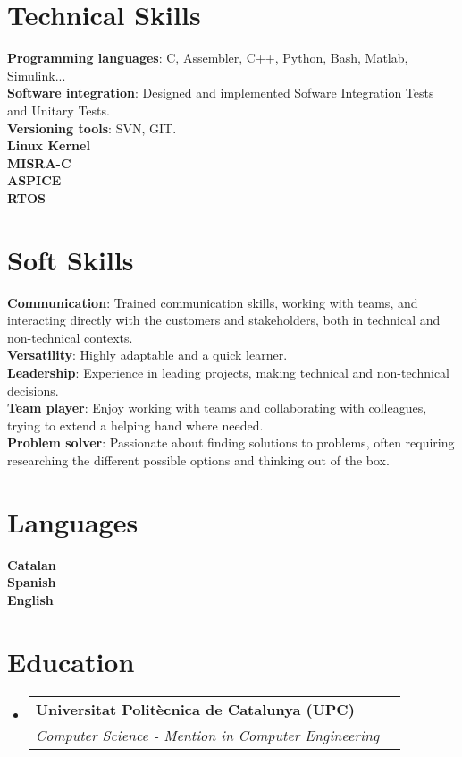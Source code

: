 \documentclass[letterpaper,11pt]{article}
\makeatletter
\newcommand{\resumeSubheading}[4]{
  \vspace{-2pt}\item
    \begin{tabular*}{0.97\textwidth}[t]{l@{\extracolsep{\fill}}r}
      \textbf{#1} & #2 \\
      \textit{\small#3} & \textit{\small #4} \\
    \end{tabular*}\vspace{-7pt}
}
\newcommand{\resumeSubHeadingListStart}{\begin{itemize}[leftmargin=0.15in, label={}]}
\newcommand{\resumeSubHeadingListEnd}{\end{itemize}}
\makeatother
\begin{document}
%
\section{Technical Skills}
 \begin{itemize}[leftmargin=0.15in, label={}]
    \small{\item{
     \textbf{Programming languages}{: C, Assembler, C++, Python, Bash, Matlab, Simulink...} \\
     \textbf{Software integration}{: Designed and implemented Sofware Integration Tests and Unitary Tests.} \\
     \textbf{Versioning tools}{: SVN, GIT.} \\
     \textbf{Linux Kernel}{} \\
     \textbf{MISRA-C}{} \\
     \textbf{ASPICE}{} \\
     \textbf{RTOS}{} \\

    }}
 \end{itemize}

\section{Soft Skills}
 \begin{itemize}[leftmargin=0.15in, label={}]
    \small{\item{
     \textbf{Communication}{: Trained communication skills, working with teams, and interacting directly with the customers and stakeholders, both in technical and non-technical contexts. } \\
     \textbf{Versatility}{: Highly adaptable and a quick learner.} \\
     \textbf{Leadership}{: Experience in leading projects, making technical and non-technical decisions.} \\
     \textbf{Team player}{: Enjoy working with teams and collaborating with colleagues, trying to extend a helping hand where needed.} \\
     \textbf{Problem solver}{: Passionate about finding solutions to problems, often requiring researching the different possible options and thinking out of the box.} \\
    }}
 \end{itemize}

\section{Languages}
 \begin{itemize}[leftmargin=0.15in, label={}]
    \small{\item{
     \textbf{Catalan}{ } \\
     \textbf{Spanish}{ } \\
     \textbf{English}{ } \\
    }}
 \end{itemize}

\section{Education}
  \resumeSubHeadingListStart
    \resumeSubheading
      {Universitat Politècnica de Catalunya (UPC)}{}
      {Computer Science - Mention in Computer Engineering}{}
  \resumeSubHeadingListEnd


\end{document}
